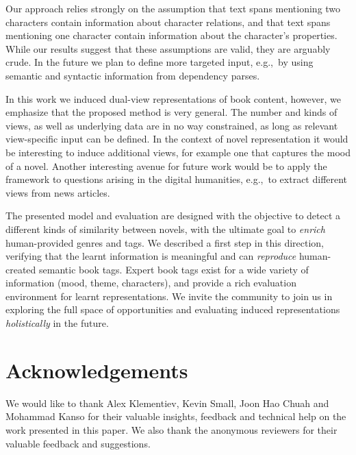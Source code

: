\documentclass[11pt,letterpaper]{article}
\begin{document}
Our approach relies strongly on the assumption that text spans mentioning two characters contain information about character relations, and that text spans mentioning one character contain information about the character's properties. While our results suggest that these assumptions are valid, they are arguably crude. In the future we plan to define more targeted input, e.g.,~by using semantic and syntactic information from dependency parses.

In this work we induced dual-view representations of book content, however, we emphasize that the proposed method is very general. The number and kinds of views, as well as underlying data are in no way constrained, as long as relevant view-specific input can be defined. In the context of novel representation it would be interesting to induce additional views, for example one that captures the mood of a novel. Another interesting avenue for future work would be to apply the framework to questions arising in the digital humanities, e.g.,~to extract different views from news articles.

The presented model and evaluation are designed with the objective to detect a different kinds of similarity between novels, with the ultimate goal to {\it enrich} human-provided genres and tags. We described a first step in this direction, verifying that the learnt information is meaningful and can {\it reproduce} human-created semantic book tags.
Expert book tags exist for a wide variety of information (mood, theme, characters), and provide a rich evaluation environment for learnt representations. We invite the community to join us in exploring the full space of opportunities and evaluating induced representations {\it holistically} in the future.

\section*{Acknowledgements}
We would like to thank Alex Klementiev, Kevin Small, Joon Hao Chuah and Mohammad Kanso for their valuable insights, feedback and technical help on the work presented in this paper. We also thank the anonymous reviewers for their valuable feedback and suggestions.




\end{document}
